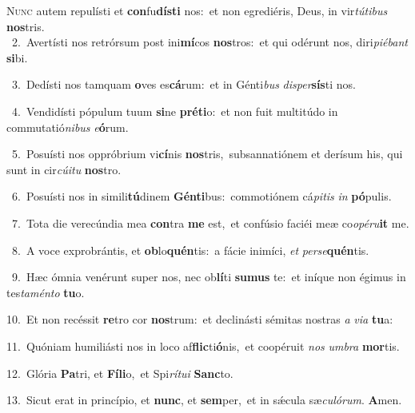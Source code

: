 \lettrine{\initial\textcolor{\initialcolor}{N}}{unc} autem repulísti et \textbf{con}\-fu\-\textbf{dís}\-\textbf{ti} nos:~\star et non egrediéris, Deus, in vir\-\textit{tú}\-\textit{ti}\textit{bus} \textbf{nos}\-tris.\\
{\numbfont\textcolor{\numbcolor}{~2.}}~Avertísti nos retrórsum post ini\-\textbf{mí}\-cos \textbf{nos}\-tros:~\star et qui odérunt nos, diri\-\textit{pi}\-\textit{é}\textit{bant} \textbf{si}\-bi.\par
{\numbfont\textcolor{\numbcolor}{~3.}}~Dedísti nos tamquam \textbf{o}\-ves es\-\textbf{cá}\-rum:~\star et in Génti\textit{bus} \textit{di}\-\textit{sper}\textbf{sís}ti nos.\par
{\numbfont\textcolor{\numbcolor}{~4.}}~Vendidísti pópulum tuum \textbf{si}\-ne \textbf{pré}\-\textbf{ti}o:~\star et non fuit multitúdo in commutatió\-\textit{ni}\-\textit{bus} \textit{e}\-\textbf{ó}rum.\par
{\numbfont\textcolor{\numbcolor}{~5.}}~Posuísti nos oppróbrium vi\-\textbf{cí}\-nis \textbf{nos}\-tris,~\star subsannatiónem et derísum his, qui sunt in cir\-\textit{cú}\-\textit{i}\textit{tu} \textbf{nos}\-tro.\par
{\numbfont\textcolor{\numbcolor}{~6.}}~Posuísti nos in simili\-\textbf{tú}\-dinem \textbf{Gén}\-\textbf{ti}bus:~\star commotiónem cá\-\textit{pi}\-\textit{tis} \textit{in} \textbf{pó}\-pulis.\par
{\numbfont\textcolor{\numbcolor}{~7.}}~Tota die verecúndia mea \textbf{con}\-tra \textbf{me} est,~\star et confúsio faciéi meæ co\-\textit{o}\-\textit{pé}\textit{ru}\textbf{it} me.\par
{\numbfont\textcolor{\numbcolor}{~8.}}~A voce exprobrántis, et \textbf{ob}\-lo\-\textbf{quén}\-tis:~\star a fácie inimíci, \textit{et} \textit{per}\-\textit{se}\textbf{quén}tis.\par
{\numbfont\textcolor{\numbcolor}{~9.}}~Hæc ómnia venérunt super nos, nec ob\-\textbf{lí}\-ti \textbf{su}\-\textbf{mus} te:~\star et iníque non égimus in tes\-\textit{ta}\-\textit{mén}\textit{to} \textbf{tu}\-o.\par
{\numbfont\textcolor{\numbcolor}{10.}}~Et non recéssit \textbf{re}\-tro cor \textbf{nos}\-trum:~\star et declinásti sémitas nostras \textit{a} \textit{vi}\-\textit{a} \textbf{tu}\-a:\par
{\numbfont\textcolor{\numbcolor}{11.}}~Quóniam humiliásti nos in loco af\-\textbf{flic}\-ti\-\textbf{ó}\-nis,~\star et coopéruit \textit{nos} \textit{um}\-\textit{bra} \textbf{mor}\-tis.\par
{\numbfont\textcolor{\numbcolor}{12.}}~Glória \textbf{Pa}\-tri, et \textbf{Fí}\-\textbf{li}o,~\star et Spi\-\textit{rí}\-\textit{tu}\textit{i} \textbf{Sanc}\-to.\par
{\numbfont\textcolor{\numbcolor}{13.}}~Sicut erat in princípio, et \textbf{nunc}\-, et \textbf{sem}\-per,~\star et in sǽcula sæ\-\textit{cu}\-\textit{ló}\textit{rum}. \textbf{A}\-men.\par
